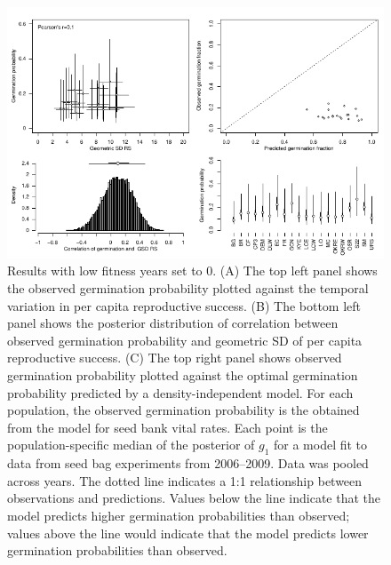 \documentclass[12pt, oneside, titlepage]{article}   	%
\begin{document}
{  \begin{figure}[h]
   \centering
       \includegraphics[page=1,width=.9\textwidth]{../manuscript/figures/analysis-figure-lowFitness.pdf}  
    \caption{ Results with low fitness years set to 0. (A) The top left panel shows the observed germination probability plotted against the temporal variation in per capita reproductive success. (B) The bottom left panel shows the posterior distribution of correlation between observed germination probability and geometric SD of per capita reproductive success. (C) The top right panel shows observed germination probability plotted against the optimal germination probability predicted by a density-independent model. For each population, the observed germination probability is the obtained from the model for seed bank vital rates. Each point is the population-specific median of the posterior of $g_1$ for a model fit to data from seed bag experiments from 2006--2009. Data was pooled across years. The dotted line indicates a 1:1 relationship between observations and predictions. Values below the line indicate that the model predicts higher germination probabilities than observed; values above the line would indicate that the model predicts lower germination probabilities than observed. }
 \label{fig:obs-pred-lowFitness}
\end{figure}

\clearpage
 


}
\end{document}
